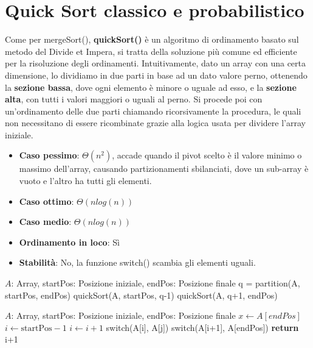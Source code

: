 \section{Quick Sort classico e probabilistico}
Come per mergeSort(), \textbf{quickSort()} è un algoritmo di ordinamento basato sul metodo del Divide et Impera, si tratta della soluzione più comune ed efficiente per la risoluzione degli ordinamenti. Intuitivamente, dato un array con una certa dimensione, lo dividiamo in due parti in base ad un dato valore perno, ottenendo la \textbf{sezione bassa}, dove ogni elemento è minore o uguale ad esso, e la \textbf{sezione alta}, con tutti i valori maggiori o uguali al perno. Si procede poi con un'ordinamento delle due parti chiamando ricorsivamente la procedura, le quali non necessitano di essere ricombinate grazie alla logica usata per dividere l'array iniziale.
\begin{itemize}
	\item \textbf{Caso pessimo}: $\Theta(n^2)$, accade quando il pivot scelto è il valore minimo o massimo dell'array, causando partizionamenti sbilanciati, dove un sub-array è vuoto e l'altro ha tutti gli elementi.
	\item \textbf{Caso ottimo}: $\Theta(nlog(n))$
	\item \textbf{Caso medio}: $\Theta(nlog(n))$
	\item \textbf{Ordinamento in loco}: Sì
	\item \textbf{Stabilità}: No, la funzione switch() scambia gli elementi uguali.
\end{itemize}
\begin{algorithm}[H]
	\caption{quickSort(A, startPos, endPos)}
	\begin{algorithmic}[i]
		\Require $A$: Array, startPos: Posizione iniziale, endPos: Posizione finale
		\State q = partition(A, startPos, endPos) 
		\State quickSort(A, startPos, q-1) 
		\State quickSort(A, q+1, endPos) 
		\EndIf
	\end{algorithmic}
\end{algorithm}
\begin{algorithm}[H]
	\caption{partition(A, startPos, endPos)}
	\begin{algorithmic}[i]
		\Require $A$: Array, startPos: Posizione iniziale, endPos: Posizione finale
		\State $x \gets A[endPos]$ 
		\State $i \gets \text{startPos}-1$ 
		\State
		 
		 
		\State $i\gets i+1$ 
		\State switch(A[i], A[j]) 
		\EndIf
		\EndFor
		\State
		\State switch(A[i+1], A[endPos]) 
		\State \textbf{return} i+1 
	\end{algorithmic}
\end{algorithm}
